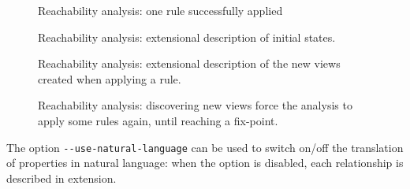 \documentclass[11pt]{book}
\begin{document}
\begin{figure}[p]

\caption{Reachability analysis: one rule successfully applied}
\label{fig:reachability_medium_ok}
\end{figure}

\begin{figure}[p]

\caption{Reachability analysis: extensional description of initial states.}
\label{fig:reachability_high_init}
\end{figure}

\begin{figure}[p]

\caption{Reachability analysis: extensional description of the new views created when applying a rule.}
\label{fig:reachability_high_rule}
\end{figure}

\begin{figure}[p]

\caption{Reachability analysis: discovering new views force the analysis to apply some rules again, until reaching a fix-point.}
\label{fig:reachability_full}
\end{figure}

The option \verb?--use-natural-language? can be used to switch on/off the translation of properties in natural language: when the option is disabled, each relationship is described in extension. 
\end{document}
